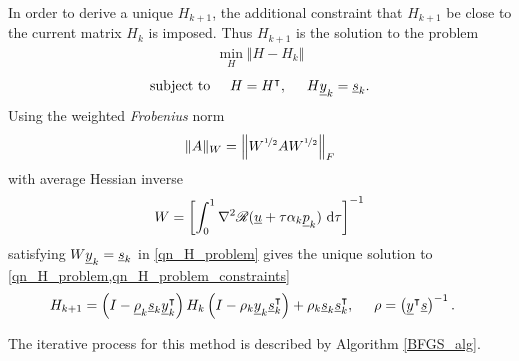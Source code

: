 In order to derive a unique $H_{k+1}$, the additional constraint that $H_{k+1}$ be close to the current matrix $H_k$ is imposed.  Thus $H_{k+1}$ is the solution to the problem
\begin{align}
  \label{qn_H_problem}
  \min_{H} \Vert H - H_k \Vert
\end{align}
\begin{align}
  \label{qn_H_problem_constraints}
  \text{subject to} \hspace{5mm} H = H^\intercal, \hspace{5mm} H \underline{y}_k = \underline{s}_k.
\end{align}
Using the weighted \emph{Frobenius} norm
\begin{align*}
  \Vert A \Vert_W = \left\Vert W^{\nicefrac{1}{2}} A W^{\nicefrac{1}{2}} \right\Vert_F
\end{align*}
with average Hessian inverse
\begin{align*}
  W = \left[ \int_0^1 \nabla^2 \mathscr{R}(\underline{u} + \tau \alpha_k \underline{p}_k ) \ \mathrm{d}\tau \right]^{-1}
\end{align*}
satisfying $W\underline{y}_k = \underline{s}_k$ in \cref{qn_H_problem} gives the unique solution to \cref{qn_H_problem,qn_H_problem_constraints}
{\footnotesize
\begin{align*}
  H_{k+1} &= \left( I - \underline{\rho}_k \underline{s}_k \underline{y}_k^\intercal \right) H_k \left( I - \rho_k \underline{y}_k \underline{s}_k^\intercal \right) + \rho_k \underline{s}_k \underline{s}_k^\intercal, \hspace{5mm} \rho = \left( \underline{y}^\intercal \underline{s} \right)^{-1}.
\end{align*}}

The iterative process for this method is described by Algorithm \cref{BFGS_alg}.

